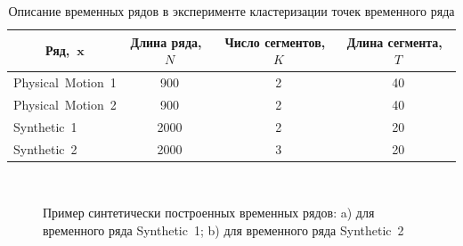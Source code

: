 \begin{table}[h!t]
\begin{center}
\caption{Описание временных рядов в эксперименте кластеризации точек временного ряда}
\label{table_1}
\begin{tabular}{|c|c|c|c|}
\hline
	Ряд,~$\textbf{x}$ &Длина ряда,~$N$& Число сегментов,~$K$&Длина сегмента,~$T$\\
	\hline
	\multicolumn{1}{|l|}{Physical~Motion~1}
	& 900& 2& 40\\
	\hline
	\multicolumn{1}{|l|}{Physical~Motion~2}
	& 900& 2& 40\\
	\hline
	\multicolumn{1}{|l|}{Synthetic~1}
	& 2000& 2& 20\\
	\hline
	\multicolumn{1}{|l|}{Synthetic~2}
	& 2000& 3& 20\\
\hline

\end{tabular}
\end{center}
\end{table}

\begin{figure}[h!t]\center
{}
\\
\caption{Пример синтетически построенных временных рядов: a) для временного ряда Synthetic~1; b) для временного ряда Synthetic~2}
\label{fig_synthetic_series}
\end{figure}


